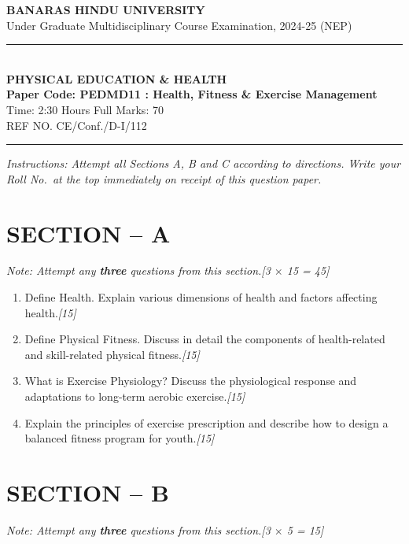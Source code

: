 \documentclass[11pt,a4paper]{article}
\newcommand{\pts}[1]{\hfill \textit{[#1]}}
\begin{document}
\begin{center}
  {\large\bfseries BANARAS HINDU UNIVERSITY}\\[2pt]
  {\normalsize Under Graduate Multidisciplinary Course Examination, 2024-25 (NEP)}\\[6pt]
  \rule{0.8\linewidth}{0.5pt}\\[6pt]
  {\large\bfseries PHYSICAL EDUCATION \& HEALTH}\\[4pt]
  {\large\bfseries Paper Code: PEDMD11 : Health, Fitness \& Exercise Management}\\[4pt]
  {\normalsize Time: 2:30 Hours \hfill Full Marks: 70}\\[2pt]
  {\small REF NO. CE/Conf./D-I/112}
\end{center}
\rule{\linewidth}{0.4pt}
\smallskip

\noindent \textit{Instructions: Attempt all Sections A, B and C according to directions. Write your Roll No.\ at the top immediately on receipt of this question paper.}

\bigskip

\section*{SECTION -- A}
\noindent \textit{Note: Attempt any \textbf{three} questions from this section.}\pts{3 $\times$ 15 = 45}

\begin{enumerate}[label=\textbf{\arabic*.},leftmargin=*,itemsep=10pt]

  \item Define Health. Explain various dimensions of health and factors affecting health.\pts{15}

  \item Define Physical Fitness. Discuss in detail the components of health-related and skill-related physical fitness.\pts{15}

  \item What is Exercise Physiology? Discuss the physiological response and adaptations to long-term aerobic exercise.\pts{15}

  \item Explain the principles of exercise prescription and describe how to design a balanced fitness program for youth.\pts{15}

\end{enumerate}

\bigskip

\section*{SECTION -- B}
\noindent \textit{Note: Attempt any \textbf{three} questions from this section.}\pts{3 $\times$ 5 = 15}
\end{document}
